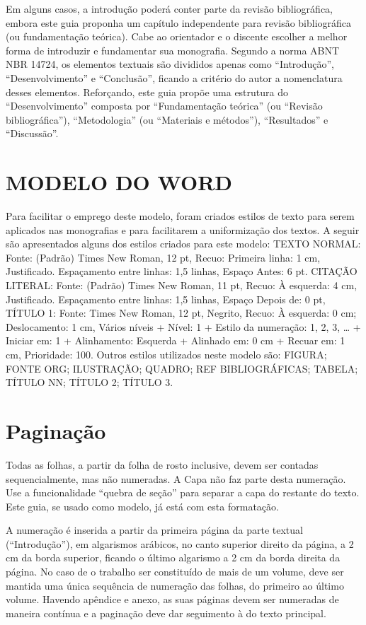 Em alguns casos, a introdução poderá conter parte da revisão bibliográfica, embora este guia proponha um capítulo independente para revisão bibliográfica (ou fundamentação teórica). 
Cabe ao orientador e o discente escolher a melhor forma de introduzir e fundamentar sua monografia. Segundo a norma ABNT NBR 14724, os elementos textuais são divididos apenas como “Introdução”, “Desenvolvimento” e “Conclusão”, ficando a critério do autor a nomenclatura desses elementos. Reforçando, este guia propõe uma estrutura do “Desenvolvimento” composta por “Fundamentação teórica” (ou “Revisão bibliográfica”), “Metodologia” (ou “Materiais e métodos”), “Resultados” e “Discussão”.

\section{MODELO DO WORD}

Para facilitar o emprego deste modelo, foram criados estilos de texto para serem aplicados nas monografias e para facilitarem a uniformização dos textos. A seguir são apresentados alguns dos estilos criados para este modelo:
TEXTO NORMAL: Fonte: (Padrão) Times New Roman, 12 pt, Recuo: Primeira linha:  1 cm, Justificado. Espaçamento entre linhas:  1,5 linhas, Espaço Antes:  6 pt.
CITAÇÃO LITERAL: Fonte: (Padrão) Times New Roman, 11 pt, Recuo: À esquerda: 4 cm, Justificado. Espaçamento entre linhas:  1,5 linhas, Espaço Depois de:  0 pt,
TÍTULO 1: Fonte: Times New Roman, 12 pt, Negrito, Recuo: À esquerda:  0 cm; Deslocamento:  1 cm, Vários níveis + Nível: 1 + Estilo da numeração: 1, 2, 3, … + Iniciar em: 1 + Alinhamento: Esquerda + Alinhado em:  0 cm + Recuar em:  1 cm, Prioridade: 100.
Outros estilos utilizados neste modelo são: FIGURA; FONTE ORG; ILUSTRAÇÃO; QUADRO; REF BIBLIOGRÁFICAS; TABELA; TÍTULO NN; TÍTULO 2; TÍTULO 3.


\section{Paginação}

Todas as folhas, a partir da folha de rosto inclusive, devem ser contadas sequencialmente, mas não numeradas. A Capa não faz  parte desta numeração. Use a funcionalidade “quebra de seção” para separar a capa do restante do texto. Este guia, se usado como modelo, já está com esta formatação.

A numeração é inserida a partir da primeira página da parte textual (“Introdução”), em algarismos arábicos, no canto superior direito da página, a 2 cm da borda superior, ficando o último algarismo a 2 cm da borda direita da página. No caso de o trabalho ser constituído de mais de um volume, deve ser mantida uma única sequência de numeração das folhas, do primeiro ao último volume. Havendo apêndice e anexo, as suas páginas devem ser numeradas de maneira contínua e a paginação deve dar seguimento à do texto principal.

